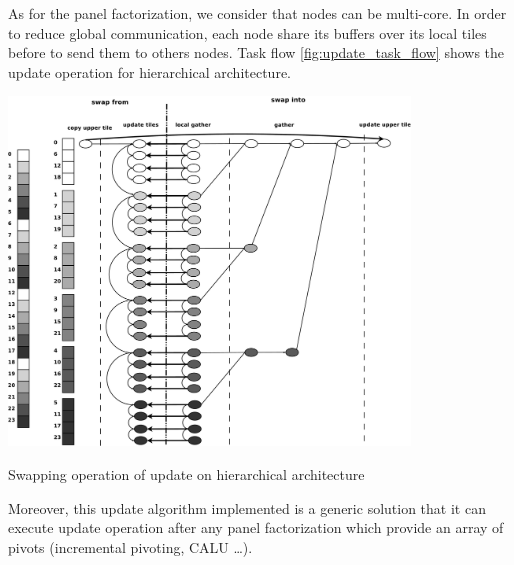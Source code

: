 As for the panel factorization, we consider that nodes can be multi-core. In order to reduce global communication, each node share its buffers over its local tiles before to send them to others nodes. Task flow \ref{fig:update_task_flow} shows the update operation for hierarchical architecture.

\begin{taskflow}[!ht]
\centering
\includegraphics[width=0.8\textwidth]{figures/update_tf_bw.pdf}
\caption{Swapping operation of update on hierarchical architecture \label{fig:update_task_flow}}
\end{taskflow}

Moreover, this update algorithm implemented is a generic solution that it can execute update operation after any panel factorization which provide an array of pivots (incremental pivoting, CALU \dots).
